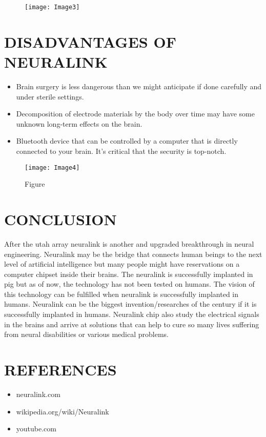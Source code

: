 \documentclass[12pt]{article}
\begin{document}
\begin{figure}
\centering
\texttt{[image: Image3]}
\caption{}
\end{figure}

\clearpage

\section{DISADVANTAGES OF NEURALINK}
\begin{itemize}

\item Brain surgery is less dangerous than we might anticipate if done carefully and under sterile settings.
\item Decomposition of electrode materials by the body over time may have some unknown long-term effects on the brain.
\item Bluetooth device that can be controlled by a computer that is directly connected to your brain. It's critical that the security is top-notch.
\end{itemize}
\begin{figure}
\centering
\texttt{[image: Image4]}
\caption{Figure}
\end{figure}

\section{CONCLUSION}

After the utah array neuralink is another and upgraded breakthrough in neural engineering. Neuralink may be the bridge that connects human beings to the next level of artificial intelligence but many people might have reservations on a computer chipset inside their brains. The neuralink is successfully implanted in pig but as of now, the technology has not been tested on humans. The vision of this technology can be fulfilled when neuralink is successfully implanted in humans. Neuralink can be the biggest invention/researches of the century if it is successfully implanted in humans. Neuralink chip also study the electrical signals in the brains and arrive at solutions that can help to cure so many lives suffering from neural disabilities or various medical problems.
\clearpage

\section{REFERENCES}
\begin{itemize}
\item neuralink.com
\item wikipedia.org/wiki/Neuralink
\item youtube.com

\end{itemize}
\end{document}

